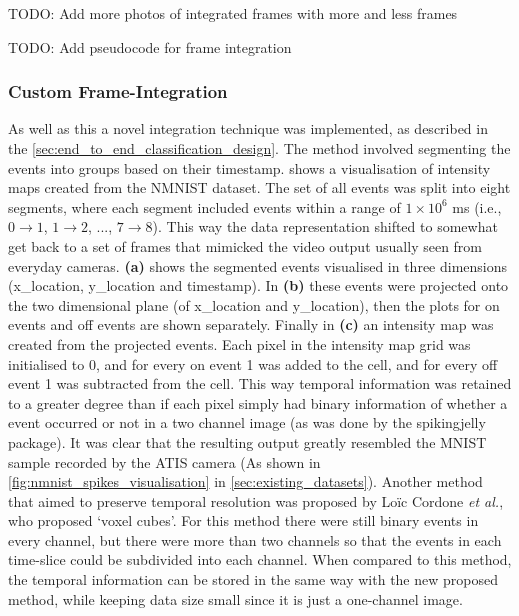 \color{red} TODO: Add more photos of integrated frames with more and less frames \color{black}

\color{red} TODO: Add pseudocode for frame integration \color{black}

\subsubsection{Custom Frame-Integration}

As well as this a novel integration technique was implemented, as described in the \cref{sec:end_to_end_classification_design}. The method involved segmenting the events into groups based on their timestamp.  shows a visualisation of intensity maps created from the NMNIST\cite{NMNIST} dataset. The set of all events was split into eight segments, where each segment included events within a range of $ 1 \times 10^6 $ ms (i.e., $ 0 \rightarrow 1 $, $ 1 \rightarrow 2 $, ..., $ 7 \rightarrow 8 $). This way the data representation shifted to somewhat get back to a set of frames that mimicked the video output usually seen from everyday cameras. \textbf{(a)} shows the segmented events visualised in three dimensions (x\_location, y\_location and timestamp). In \textbf{(b)} these events were projected onto the two dimensional plane (of x\_location and y\_location), then the plots for on events and off events are shown separately. Finally in \textbf{(c)} an intensity map was created from the projected events. Each pixel in the intensity map grid was initialised to 0, and for every on event 1 was added to the cell, and for every off event 1 was subtracted from the cell. This way temporal information was retained to a greater degree than if each pixel simply had binary information of whether a event occurred or not in a two channel image (as was done by the spikingjelly package\cite{SpikingJelly}). It was clear that the resulting output greatly resembled the MNIST\cite{MNIST} sample recorded by the ATIS camera (As shown in \cref{fig:nmnist_spikes_visualisation} in \cref{sec:existing_datasets}). Another method that aimed to preserve temporal resolution was proposed by Lo\"ic Cordone \textit{et al.}, who proposed `voxel cubes'\cite{MiniVovelCubes}. For this method there were still binary events in every channel, but there were more than two channels so that the events in each time-slice could be subdivided into each channel. When compared to this method, the temporal information can be stored in the same way with the new proposed method, while keeping data size small since it is just a one-channel image. 

